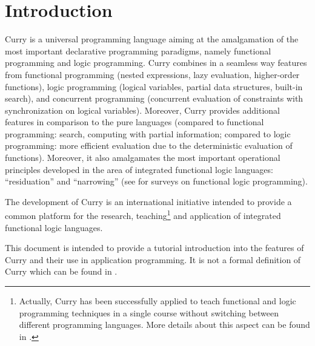 \chapter{Introduction}

Curry is a universal programming language aiming at the amalgamation
of the most important declarative programming paradigms,
namely functional programming and logic programming.  
Curry combines in a seamless way features from functional programming
(nested expressions, lazy evaluation, higher-order functions),
logic programming (logical variables, partial data structures,
built-in search), and concurrent programming (concurrent evaluation
of constraints with synchronization on logical variables).
Moreover, Curry provides additional features in
comparison to the pure languages (compared to functional programming:
search, computing with partial information; compared to logic
programming: more efficient evaluation due to the deterministic
evaluation of functions).
Moreover, it also amalgamates the most
important operational principles developed in the area of integrated
functional logic languages: ``residuation'' and ``narrowing'' (see
\cite{Hanus94JLP,Hanus07ICLP} for surveys on functional logic programming).

The development of Curry is an international initiative intended to
provide a common platform for the research, teaching\footnote{%
Actually, Curry has been successfully applied to teach functional and
logic programming techniques in a single course without switching
between different programming languages. More details about
this aspect can be found in \cite{Hanus97DPLE}.}
and application of integrated functional logic languages.

This document is intended to provide a tutorial introduction
into the features of Curry and their use in application programming.
It is not a formal definition of Curry which can be found
in \cite{Hanus12Curry}.




